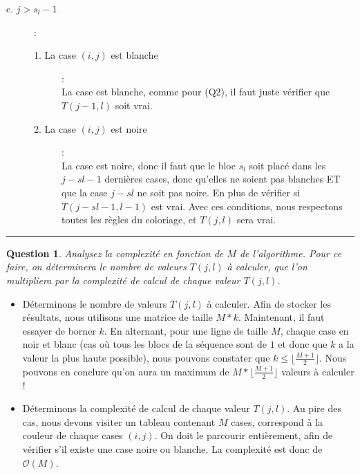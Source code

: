 \documentclass[a4paper,12pt]{article}
\newtheorem{exo}{Question}
\begin{document}
\begin{description}
\begin{description}
		\item[c. $j > s_l - 1$] :
		\begin{description}
			\item[1. La case $(i,j)$ est blanche] :\\
			La case est blanche, comme pour (Q2), il faut juste vérifier que $T(j - 1, l)$ soit vrai.
		
			\item[2. La case $(i,j)$ est noire] :\\
			La case est noire, donc il faut que le bloc $s_l$ soit placé dans les $j - sl - 1$ dernières cases, donc qu'elles ne soient pas blanches ET que la case $j - sl$ ne soit pas noire. En plus de vérifier si $T(j - sl - 1, l - 1)$ est vrai.
			Avec ces conditions, nous respectons toutes les règles du coloriage, et $T(j, l)$ sera vrai.
		\end{description}
		
	\end{description}
\end{description}

\noindent\rule{\textwidth}{1pt}
\newpage


\begin{exo}
	Analysez la complexité en fonction de $M$ de l'algorithme. Pour ce faire, on déterminera le nombre de valeurs $T(j,l)$ à calculer, que l'on multipliera par la complexité de calcul de chaque valeur $T(j,l)$.
\end{exo}

\begin{itemize}
	\item Déterminons le nombre de valeurs $T(j,l)$ à calculer. Afin de stocker les résultats, nous utilisons une matrice de taille $M*k$. Maintenant, il faut essayer de borner $k$. En alternant, pour une ligne de taille $M$, chaque case en noir et blanc (cas où tous les blocs de la séquence sont de $1$ et donc que $k$ a la valeur la plus haute possible), nous pouvons constater que $k \leq \lfloor \frac{M+1}{2} \rfloor$. Nous pouvons en conclure qu'on aura un maximum de $M * \lfloor \frac{M+1}{2} \rfloor$ valeurs à calculer !

	\item Déterminons la complexité de calcul de chaque valeur $T(j,l)$. Au pire des cas, nous devons visiter un tableau contenant $M$ cases, correspond à la couleur de chaque cases $(i,j)$. On doit le parcourir entièrement, afin de vérifier s'il existe une case noire ou blanche. La complexité est donc de $\mathcal{O}(M).$
\end{itemize}
\end{document}
